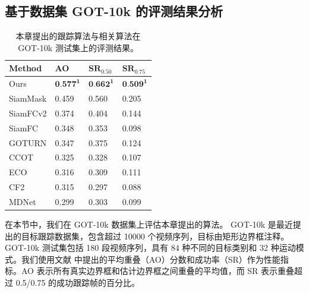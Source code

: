 
\subsection{基于数据集 GOT-10k 的评测结果分析}
\begin{table}[t]
\centering
\caption{本章提出的跟踪算法与相关算法在 GOT-10k \cite{GOT-10k} 测试集上的评测结果。}
\begin{tabular}{l l l l}
\bottomrule
Method   &  AO   &  $\textbf{SR}_{0.50}$ & $\textbf{SR}_{0.75}$  \\
\hline
Ours &  $\textbf{0.577}^\textbf{1}$ & $\textbf{0.662}^\textbf{1}$  & $\textbf{0.509}^\textbf{1}$  \\
SiamMask &  0.459&  0.560 &0.205 \\
SiamFCv2 &  0.374&  0.404 &0.144 \\
SiamFC   &  0.348&  0.353 &0.098 \\
GOTURN	 &  0.347&  0.375 &0.124 \\
CCOT	 &  0.325&  0.328 &0.107 \\
ECO	     &  0.316&  0.309 &0.111 \\
CF2	     &  0.315&  0.297 &0.088 \\
MDNet	 &  0.299&  0.303 &0.099 \\
\bottomrule
\end{tabular}
\end{table}
在本节中，我们在 GOT-10k \cite{GOT-10k} 数据集上评估本章提出的算法。
GOT-10k 是最近提出的目标跟踪数据集，包含超过 10000 个视频序列，目标由矩形边界框注释。
GOT-10k 测试集包括 180 段视频序列，具有 84 种不同的目标类别和 32 种运动模式。我们使用文献 \cite{GOT-10k} 中提出的平均重叠（AO）分数和成功率（SR）作为性能指标。AO 表示所有真实边界框和估计边界框之间重叠的平均值，而 SR 表示重叠超过 0.5/0.75 的成功跟踪帧的百分比。

